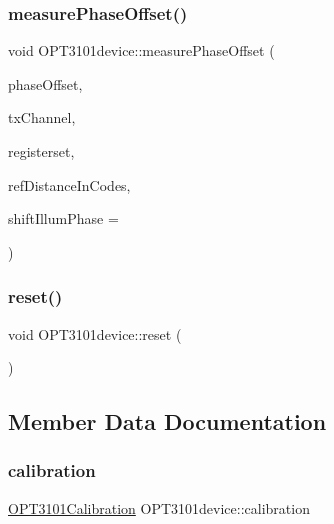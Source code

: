 \mbox{\label{class_o_p_t3101device_ace7558bef9a42a7103a60fb91c196e4d}} 
\subsubsection{\texorpdfstring{measure\+Phase\+Offset()}{measurePhaseOffset()}}
{\footnotesize\ttfamily void O\+P\+T3101device\+::measure\+Phase\+Offset (\begin{DoxyParamCaption}\item[{\mbox{\hyperlink{class_o_p_t3101_1_1phase_offset_c}{O\+P\+T3101\+::phase\+OffsetC}} $\ast$}]{phase\+Offset,  }\item[{uint8\+\_\+t}]{tx\+Channel,  }\item[{char}]{registerset,  }\item[{uint16\+\_\+t}]{ref\+Distance\+In\+Codes,  }\item[{uint8\+\_\+t}]{shift\+Illum\+Phase = {} }\end{DoxyParamCaption})}

\mbox{\label{class_o_p_t3101device_a2e9a97e6eddcd15a03e68f0f43012d55}} 
\subsubsection{\texorpdfstring{reset()}{reset()}}
{\footnotesize\ttfamily void O\+P\+T3101device\+::reset (\begin{DoxyParamCaption}\item[{void}]{ }\end{DoxyParamCaption})}



\subsection{Member Data Documentation}
\mbox{\label{class_o_p_t3101device_a8f1283a73fbfac90ccc2a8f5ab6ae382}} 
\subsubsection{\texorpdfstring{calibration}{calibration}}
{\footnotesize\ttfamily \mbox{\hyperlink{class_o_p_t3101_calibration}{O\+P\+T3101\+Calibration}} O\+P\+T3101device\+::calibration}

